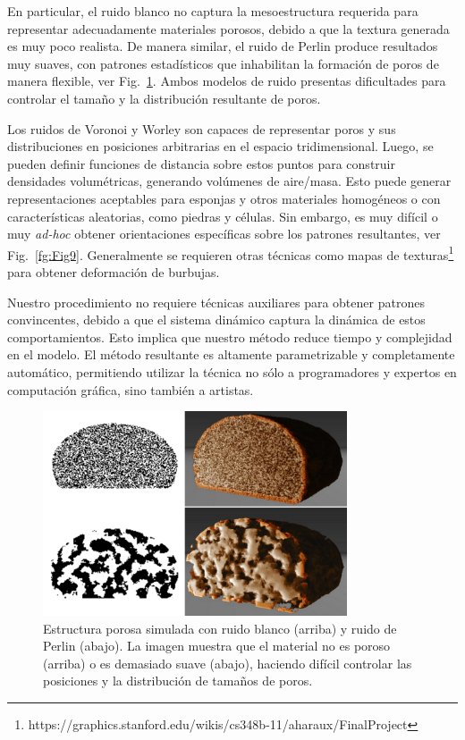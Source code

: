 En particular, el ruido blanco no captura la mesoestructura requerida para representar adecuadamente materiales porosos, debido a que la textura generada es muy poco realista.
De manera similar, el ruido de Perlin produce resultados muy suaves, con patrones estadísticos que inhabilitan la formación de poros de manera flexible, ver Fig.~\ref{fg:Fig8}.
Ambos modelos de ruido presentas dificultades para controlar el tamaño y la distribución resultante de poros.

Los ruidos de Voronoi y Worley son capaces de representar poros y sus distribuciones en posiciones arbitrarias en el espacio tridimensional.
Luego, se pueden definir funciones de distancia sobre estos puntos para construir densidades volumétricas, generando volúmenes de aire/masa.
Esto puede generar representaciones aceptables para esponjas y otros materiales homogéneos o con características aleatorias, como piedras y células.
Sin embargo, es muy difícil o muy {\em ad-hoc} obtener orientaciones específicas sobre los patrones resultantes, ver Fig.~\ref{fg:Fig9}.
Generalmente se requieren otras técnicas como mapas de texturas\footnote{https://graphics.stanford.edu/wikis/cs348b-11/aharaux/FinalProject} para obtener deformación de burbujas.

Nuestro procedimiento no requiere técnicas auxiliares para obtener patrones convincentes, debido a que el sistema dinámico captura la dinámica de estos comportamientos.
Esto implica que nuestro método reduce tiempo y complejidad en el modelo.
El método resultante es altamente parametrizable y completamente automático, permitiendo utilizar la técnica no sólo a programadores y expertos en computación gráfica, sino también a artistas.


\begin{figure}
  \centerline{\includegraphics[width=9cm]{figures/Fig8}}
  \caption{Estructura porosa simulada con ruido blanco (arriba) y ruido de Perlin (abajo). La imagen muestra que el material no es poroso (arriba) o es demasiado suave (abajo), haciendo difícil controlar las posiciones y la distribución de tamaños de poros.}
  \label{fg:Fig8}
\end{figure}

